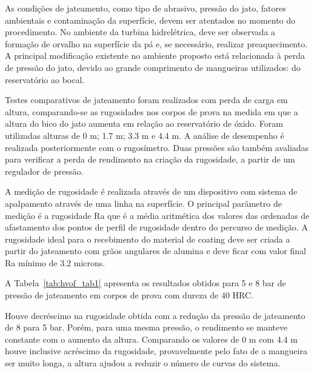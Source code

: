 As condições de jateamento, como tipo de abrasivo, pressão do jato, fatores
ambientais e contaminação da superfície, devem ser atentados no momento do
procedimento. No ambiente da turbina hidrelétrica, deve ser observada a
formação de orvalho na superfície da pá e, se necessário, realizar
preaquecimento. A principal modificação existente no ambiente proposto está
relacionada à perda de pressão do jato, devido ao grande comprimento de
mangueiras utilizados: do reservatório ao bocal.

Testes comparativos de jateamento foram realizados com perda de carga em
altura, comparando-se as rugosidades nos corpos de prova na medida em
que a altura do bico do jato aumenta em relação ao reservatório de óxido. Foram
utilizadas alturas de 0 m; 1.7 m; 3.3 m e 4.4 m. A análise de desempenho é
realizada posteriormente com o rugosímetro. Duas pressões são também avaliadas
para verificar a perda de rendimento na criação da rugosidade, a partir de um
regulador de pressão.

A medição de rugosidade é realizada através de um dispositivo com sistema de
apalpamento através de uma linha na superfície. O principal parâmetro de
medição é a rugosidade Ra que é a média aritmética dos valores das ordenadas de
afastamento dos pontos de perfil de rugosidade dentro do percurso de medição. A
rugosidade ideal para o recebimento do material de coating deve ser criada a
partir do jateamento com grãos angulares de alumina e deve ficar com valor
final Ra mínimo de 3.2 microns.

A Tabela~\ref{tab:hvof_tab1} apresenta os resultados obtidos para 5 e
8 bar de pressão de jateamento em corpos de prova com dureza de 40 HRC.

Houve decréscimo na rugosidade obtida com a redução da pressão de jateamento de
8 para 5 bar. Porém, para uma mesma pressão, o rendimento se manteve constante
com o aumento da altura. Comparando os valores de 0 m com 4.4 m houve inclusive
acréscimo da rugosidade, provavelmente pelo fato de a mangueira ser muito
longa, a altura ajudou a reduzir o número de curvas do sistema. 

